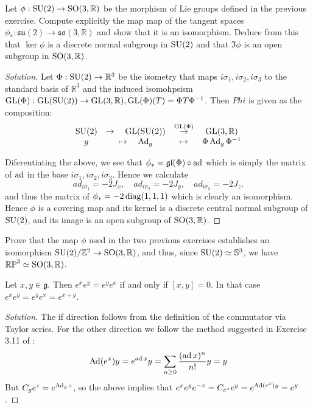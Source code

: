 \documentclass{report}
\begin{document}
\begin{exercise}[Exercise 2.9]
    Let $\phi: \operatorname{{\mathrm{SU}}}(2) \to \operatorname{{\mathrm{SO}}}(3, \mathbb R)$ be the morphism of Lie groups defined in the previous exercise.
    Compute explicitly the map map of the tangent spaces $\phi_*: \mathfrak{su}(2) \to \mathfrak{so}(3, \mathbb R)$ and show that it is an isomorphism.
    Deduce from this that $\ker \phi$ is a discrete normal subgroup in $\operatorname{{\mathrm{SU}}}(2)$ and that $\Im \phi$ is an open subgroup in $\operatorname{{\mathrm{SO}}}(3, \mathbb R)$.
\end{exercise}
\begin{proof}[Solution]
    Let $\Phi: \operatorname{{\mathrm{SU}}}(2) \to \mathbb R^3$ be the isometry that maps $i\sigma_1, i \sigma_2, i\sigma_3$ to the standard basis of $\mathbb R^3$ and the induced isomohpsism $\operatorname{{\mathrm{GL}}}(\Phi): \operatorname{{\mathrm{GL}}}(\operatorname{{\mathrm{SU}}}(2)) \to \operatorname{{\mathrm{GL}}}(3, \mathbb R), \operatorname{{\mathrm{GL}}}(\Phi)(T) = \Phi T \Phi^{-1}$.
    Then $Phi$ is given as the composition:
    \[\begin{array}{ccccc}
        \operatorname{{\mathrm{SU}}}(2) &\to \quad \operatorname{{\mathrm{GL}}}(\operatorname{{\mathrm{SU}}}(2)) &\overset{\operatorname{{\mathrm{GL}}}(\Phi)}{\to} &\operatorname{{\mathrm{GL}}}(3, \mathbb R) \\
        g &\mapsto \quad \operatorname{Ad}_g &\mapsto &\Phi \operatorname{Ad}_g \Phi^{-1}
    \end{array}\]

    Diferentiating the above, we see that $\phi_* = \mathfrak{gl}(\Phi) \circ \operatorname{ad}$ which is simply the matrix of $\operatorname{ad}$ in the base $i\sigma_1, i\sigma_2, i\sigma_3$.
    Hence we calculate
    \[
    ad_{i\sigma_1} = - 2J_x, \quad
    ad_{i\sigma_2} = - 2J_y, \quad
    ad_{i\sigma_3} = - 2J_z.
    \]
    and thus the matrix of $\phi_* = -2 \operatorname{diag}(1,1,1)$ which is clearly an isomorphism.
    Hence $\phi$ is a covering map and its kernel is a discrete central normal subgroup of $\operatorname{{\mathrm{SU}}}(2)$, and its image is an open subgroup of $\operatorname{{\mathrm{SO}}}(3, \mathbb R)$.
\end{proof}

\begin{exercise}
    Prove that the map $\phi$ used in the two previous exercises establishes an isomorphism $\operatorname{{\mathrm{SU}}}(2)/\mathbb Z^2 \to \operatorname{{\mathrm{SO}}}(3, \mathbb R)$, and thus, since $\operatorname{{\mathrm{SU}}}(2)\simeq \mathbb S^3$, we have $\mathbb{RP}^3 \simeq \operatorname{{\mathrm{SO}}}(3, \mathbb R)$.
\end{exercise}
\begin{exercise}[Exercise 3.12]
        Let $x, y \in \mathfrak g$.
        Then $e^x e^y = e^y e^x$ if and only if $[x,y]=0$.
        In that case $e^x e^y = e^y e^x = e^{x+y}$.    
\end{exercise}
\begin{proof}[Solution]
    The if direction follows from the definition of the commutator via Taylor series.
    For the other direction we follow the method suggested in Exercise 3.11 of \cite{kirillov2008introduction}:
    \[
    \operatorname{Ad}(e^x)y = e^{\operatorname{ad} x} y = \sum_{n\geq 0} \frac{(\operatorname{ad} x)^n}{n!} y = y
    \]
    But $C_g e^z = e^{\operatorname{Ad}_g z}$, so the above implies that $e^x e^y e^{-x} = C_{e^x}e^y = e^{\operatorname{Ad}(e^x)y} = e^y$.
\end{proof}
\end{document}
